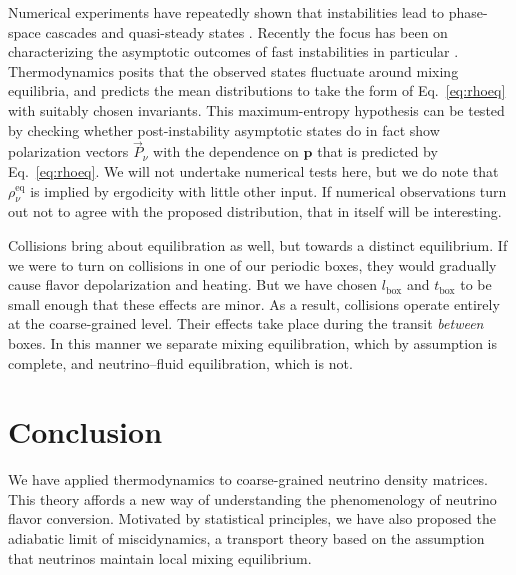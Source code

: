 \documentclass[aps,prd,twocolumn,groupedaddress,preprintnumbers]{revtex4-2}
\begin{document}
Numerical experiments have repeatedly shown that instabilities lead to phase-space cascades and quasi-steady states \cite{sawyer2005, raffelt2007b, mangano2014, mirizzi2015, johns2020b, bhattacharyya2020, richers2021b, nagakura2022}. Recently the focus has been on characterizing the asymptotic outcomes of fast instabilities in particular \cite{bhattacharyya2021, nagakura2023b, zaizen2023b, zaizen2023, xiong2023d, richers2024asymptotic, george2024evolution, abbar2024physics, liu2025asymptotic}. Thermodynamics posits that the observed states fluctuate around mixing equilibria, and predicts the mean distributions to take the form of Eq.~\eqref{eq:rhoeq} with suitably chosen invariants. This maximum-entropy hypothesis can be tested by checking whether post-instability asymptotic states do in fact show polarization vectors $\vec{P}_\nu$ with the dependence on $\boldsymbol{p}$ that is predicted by Eq.~\eqref{eq:rhoeq}. We will not undertake numerical tests here, but we do note that $\rho_\nu^\textrm{eq}$ is implied by ergodicity with little other input. If numerical observations turn out not to agree with the proposed distribution, that in itself will be interesting.

Collisions bring about equilibration as well, but towards a distinct equilibrium. If we were to turn on collisions in one of our periodic boxes, they would gradually cause flavor depolarization and heating. But we have chosen $l_\textrm{box}$ and $t_\textrm{box}$ to be small enough that these effects are minor. As a result, collisions operate entirely at the coarse-grained level. Their effects take place during the transit \textit{between} boxes. In this manner we separate mixing equilibration, which by assumption is complete, and neutrino--fluid equilibration, which is not.












\section{Conclusion}

We have applied thermodynamics to coarse-grained neutrino density matrices. This theory affords a new way of understanding the phenomenology of neutrino flavor conversion. Motivated by statistical principles, we have also proposed the adiabatic limit of miscidynamics, a transport theory based on the assumption that neutrinos maintain local mixing equilibrium.
\end{document}
